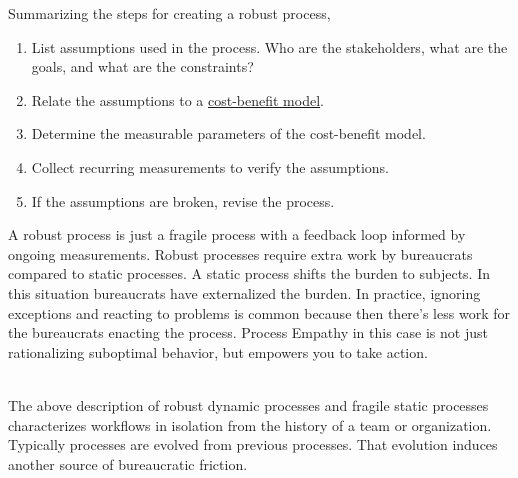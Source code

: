 Summarizing the steps for creating a robust process,
\begin{enumerate}
    \item List assumptions used in the process. Who are the stakeholders, what are the goals, and what are the constraints?
    \item Relate the assumptions to a \href{https://en.wikipedia.org/wiki/Cost\%E2\%80\%93benefit_analysis}{cost-benefit model}.
    \iftoggle{WPinmargin}{\marginpar{$>$Wikipedia: cost-benefit model}}{}
    \item Determine the measurable parameters of the cost-benefit model. 
    \item Collect recurring measurements to verify the assumptions. 
    \item If the assumptions are broken, revise the process. 
\end{enumerate}
A robust process is just a fragile process with a feedback loop informed by ongoing measurements. Robust processes require extra work by bureaucrats compared to static processes. A static process shifts the burden to subjects. In this situation bureaucrats have externalized the burden.
In practice, ignoring exceptions and reacting to problems is common because then there's less work for the bureaucrats enacting the process. Process Empathy in this case is not just rationalizing suboptimal behavior, but empowers you to take action. 

\ \\

The above description of robust dynamic processes and fragile static processes characterizes workflows in isolation from the history of a team or organization. Typically processes are evolved from previous processes.  That evolution induces another source of bureaucratic friction. 
